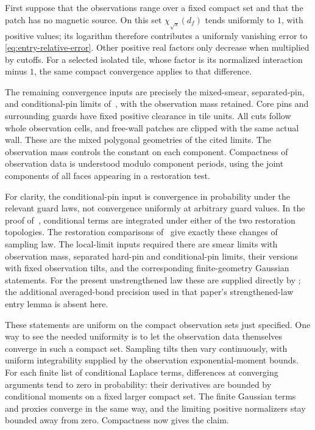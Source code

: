 First suppose that the observations range over a fixed compact set
and that the patch has no magnetic source. On this set
$\chi_{\sqrt{s}}(d_f)$ tends uniformly to $1$, with positive values;
its logarithm therefore contributes a uniformly vanishing error to
\eqref{eq:entry-relative-error}. Other positive real factors only
decrease when multiplied by cutoffs. For a selected isolated tile,
whose factor is its normalized interaction minus $1$, the same compact
convergence applies to that difference.

The remaining convergence inputs are precisely the mixed-smear,
separated-pin, and conditional-pin limits of~\cite{X}, with the
observation mass retained. Core pins and surrounding guards have fixed
positive clearance in tile units. All cuts follow whole observation
cells, and free-wall patches are clipped with the same actual wall.
These are the mixed polygonal geometries of the cited limits. The
observation mass controls the constant on each component. Compactness
of observation data is understood modulo component periods, using the
joint components of all faces appearing in a restoration test.

For clarity, the conditional-pin input is convergence in probability
under the relevant guard laws, not convergence uniformly at arbitrary
guard values. In the proof of~\cite[Equation
(5.20)]{X}, conditional terms are integrated under
either of the two restoration topologies. The restoration comparisons
of~\cite[Lemma 3.9]{X} give exactly these changes
of sampling law. The local-limit inputs required there are smear
limits with observation mass, separated hard-pin and conditional-pin
limits, their versions with fixed observation tilts, and the
corresponding finite-geometry Gaussian statements. For the present
unstrengthened law these are supplied directly by
\cite[Theorem 3.1 and the following restoration
estimates]{X}; the additional averaged-bond precision used in that
paper's strengthened-law entry lemma is absent here.

These statements are uniform on the compact observation sets just
specified. One way to see the needed uniformity is to let the
observation data themselves converge in such a compact set. Sampling
tilts then vary continuously, with uniform integrability supplied by
the observation exponential-moment bounds. For each finite list of
conditional Laplace terms, differences at converging arguments tend
to zero in probability: their derivatives are bounded by conditional
moments on a fixed larger compact set. The finite Gaussian terms and
proxies converge in the same way, and the limiting positive
normalizers stay bounded away from zero. Compactness now gives the
claim.

